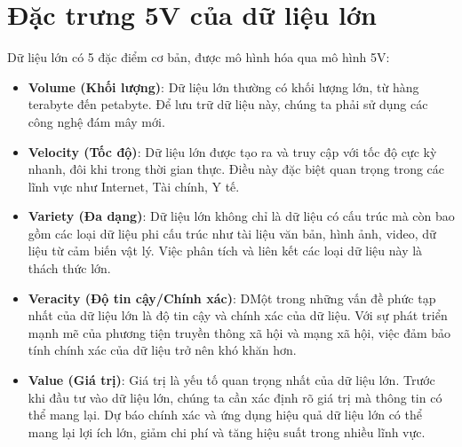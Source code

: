 \documentclass{report}
\begin{document}
\section{Đặc trưng 5V của dữ liệu lớn}
Dữ liệu lớn có 5 đặc điểm cơ bản, được mô hình hóa qua mô hình 5V:
\begin{itemize}
    \item \textbf{Volume (Khối lượng)}: Dữ liệu lớn thường có khối lượng lớn,
          từ hàng terabyte đến petabyte. Để lưu trữ dữ liệu này, chúng ta phải
          sử dụng các công nghệ đám mây mới.
    \item \textbf{Velocity (Tốc độ)}: Dữ liệu lớn được tạo ra và truy cập với
          tốc độ cực kỳ nhanh, đôi khi trong thời gian thực. Điều này đặc biệt quan
          trọng trong các lĩnh vực như Internet, Tài chính, Y tế.
    \item \textbf{Variety (Đa dạng)}: Dữ liệu lớn không chỉ là dữ liệu có cấu trúc
          mà còn bao gồm các loại dữ liệu phi cấu trúc như tài liệu văn bản, hình ảnh,
          video, dữ liệu từ cảm biến vật lý. Việc phân tích và liên kết các loại dữ liệu
          này là thách thức lớn.
    \item \textbf{Veracity (Độ tin cậy/Chính xác)}: DMột trong những vấn đề phức tạp
          nhất của dữ liệu lớn là độ tin cậy và chính xác của dữ liệu. Với sự phát triển
          mạnh mẽ của phương tiện truyền thông xã hội và mạng xã hội, việc đảm bảo tính
          chính xác của dữ liệu trở nên khó khăn hơn.
    \item \textbf{Value (Giá trị)}: Giá trị là yếu tố quan trọng nhất của dữ liệu
          lớn. Trước khi đầu tư vào dữ liệu lớn, chúng ta cần xác định rõ giá trị mà
          thông tin có thể mang lại. Dự báo chính xác và ứng dụng hiệu quả dữ liệu lớn
          có thể mang lại lợi ích lớn, giảm chi phí và tăng hiệu suất trong nhiều lĩnh
          vực.
\end{itemize}

\end{document}
